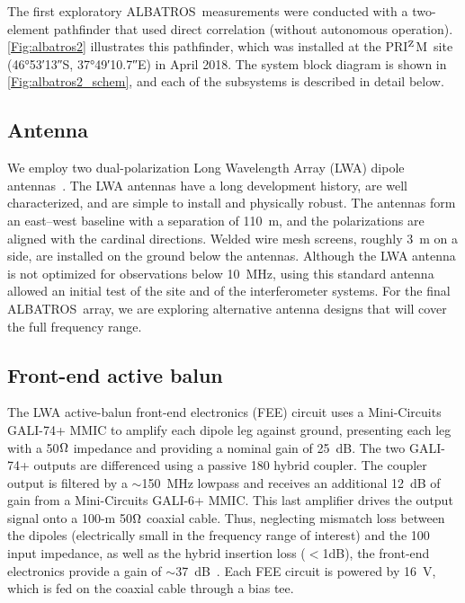 \documentclass{ws-jai}
\def\albatros{ALBATROS}
\def\prizm{PRI$^{\rm Z}$M}
\begin{document}
The first exploratory \albatros\ measurements were conducted with a
two-element pathfinder that used direct correlation (without
autonomous operation).  \autoref{Fig:albatros2} illustrates this
pathfinder, which was installed at the \prizm\ site (\ang{46;53;13}S,
\ang{37;49;10.7}E) in April 2018.  The system block diagram is shown
in \autoref{Fig:albatros2_schem}, and each of the subsystems is
described in detail below.

\subsection{Antenna}\label{s:antenna}

We employ two dual-polarization Long Wavelength Array (LWA) dipole
antennas~\citep{Memo28}.  The LWA antennas have a long development
history, are well characterized, and are simple to install and
physically robust.  The antennas form an east--west baseline with a
separation of \SI{110}{m}, and the polarizations are aligned with the
cardinal directions.  Welded wire mesh screens, roughly 3~m on a side,
are installed on the ground below the antennas.  Although the LWA
antenna is not optimized for observations below 10~MHz, using this
standard antenna allowed an initial test of the site and of the
interferometer systems.  For the final \albatros\ array, we are
exploring alternative antenna designs that will cover the full
frequency range.

\subsection{Front-end active balun}\label{s:fee}

The LWA active-balun front-end electronics (FEE) circuit uses a
Mini-Circuits GALI-74+ MMIC to amplify each dipole leg against ground,
presenting each leg with a 50$\ohm$ impedance and providing a nominal
gain of 25~dB. The two GALI-74+ outputs are differenced using a
passive {180\degree} hybrid coupler. The coupler output is filtered by
a $\sim$150~MHz lowpass and receives an additional 12~dB of gain from
a Mini-Circuits GALI-6+ MMIC. This last amplifier drives the output
signal onto a 100-m 50$\ohm$ coaxial cable. Thus, neglecting mismatch
loss between the dipoles (electrically small in the frequency range of
interest) and the 100{\ohm} input impedance, as well as the hybrid
insertion loss ($<$1dB), the front-end electronics provide a gain of
$\sim$37~dB~\citep{2012PASP..124.1090H}.  Each FEE circuit is powered
by 16~V, which is fed on the coaxial cable through a bias tee.
\end{document}
